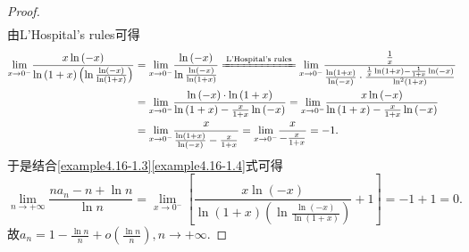 \documentclass[../../main.tex]{subfiles}%
\begin{document}
\begin{proof}
\begin{align}
\label{example4.16-1.3}
\end{align}
由L'Hospital's rules可得
\begin{align}
\underset{x\rightarrow 0^-}{\lim}\frac{x\ln \left( -x \right)}{\ln \left( 1+x \right) \left( \ln \frac{\ln \left( -x \right)}{\ln \left( 1+x \right)} \right)}&=\underset{x\rightarrow 0^-}{\lim}\frac{\ln \left( -x \right)}{\ln \frac{\ln \left( -x \right)}{\ln \left( 1+x \right)}}\xlongequal{\text{L'Hospital's rules}}\underset{x\rightarrow 0^-}{\lim}\frac{\frac{1}{x}}{\frac{\ln \left( 1+x \right)}{\ln \left( -x \right)}\cdot \frac{\frac{1}{x}\ln \left( 1+x \right) -\frac{1}{1+x}\ln \left( -x \right)}{\ln ^2\left( 1+x \right)}}\nonumber
\\
&=\underset{x\rightarrow 0^-}{\lim}\frac{\ln \left( -x \right) \cdot \ln \left( 1+x \right)}{\ln \left( 1+x \right) -\frac{x}{1+x}\ln \left( -x \right)}=\underset{x\rightarrow 0^-}{\lim}\frac{x\ln \left( -x \right)}{\ln \left( 1+x \right) -\frac{x}{1+x}\ln \left( -x \right)}\nonumber
\\
&=\underset{x\rightarrow 0^-}{\lim}\frac{x}{\frac{\ln \left( 1+x \right)}{\ln \left( -x \right)}-\frac{x}{1+x}}=\underset{x\rightarrow 0^-}{\lim}\frac{x}{-\frac{x}{1+x}}=-1.
\label{example4.16-1.4}
\end{align}
于是结合\eqref{example4.16-1.3}\eqref{example4.16-1.4}式可得
\[
\lim_{n\rightarrow +\infty}\frac{na_n - n + \ln n}{\ln n} = \lim_{x\rightarrow 0^-}\left[ \frac{x\ln(-x)}{\ln(1 + x)\left(\ln \frac{\ln(-x)}{\ln(1 + x)}\right)} + 1 \right] = -1 + 1 = 0.
\]
故\(a_n = 1 - \frac{\ln n}{n} + o\left(\frac{\ln n}{n}\right), n \rightarrow +\infty\).

\end{proof}
\end{document}
